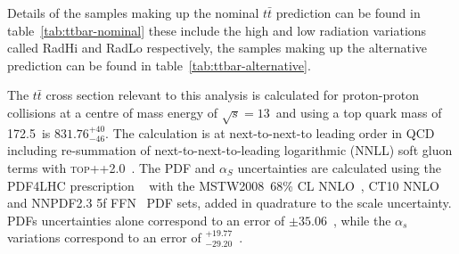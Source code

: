 Details of the samples making up the nominal $t\bar{t}$ prediction can be found
in table~\ref{tab:ttbar-nominal} these include the high and low radiation
variations called  RadHi and RadLo respectively, the samples making up the
alternative prediction can be found in table~\ref{tab:ttbar-alternative}.

The $t\bar{t}$ cross section relevant to this analysis is calculated for
proton-proton collisions at a centre of mass energy of $\sqrt{s} = 13$~\TeV and
using a top quark mass of 172.5~\GeV is $831.76^{+40}_{-46}$\picobarn. The
calculation is  at next-to-next-to leading order in QCD including re-summation
of next-to-next-to-leading logarithmic (NNLL) soft gluon terms with
\textsc{top++2.0}~\cite{Beneke2012695,Cacciari2012612,PhysRevLett.109.132001,NNLOcorr,NNLOcorrNLO,PhysRevLett.110.252004,Czakon:2011xx}.
The PDF and $\alpha_S$ uncertainties are calculated using the PDF4LHC
prescription ~\cite{Botje:2011sn} with the MSTW2008~68\% CL
NNLO~\cite{PDFLHC,alphasunc}, CT10
NNLO~\cite{PhysRevD.82.074024,PhysRevD.89.033009} and NNPDF2.3 5f
FFN~\cite{Ball:2012cx} PDF sets, added in quadrature to the scale uncertainty.
PDFs uncertainties alone correspond to an error of $\pm 35.06$~\picobarn, while
the $\alpha_s$ variations correspond to an error of
$^{+19.77}_{-29.20}$~\picobarn.




          
